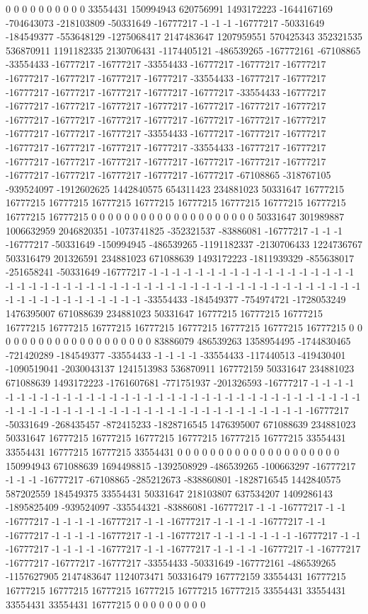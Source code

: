 0 0 0 0 0 0 0 0 0 0 33554431 150994943 620756991 1493172223 -1644167169 -704643073 -218103809 -50331649 -16777217 -1 -1 -1 -16777217 -50331649 -184549377 -553648129 -1275068417 2147483647 1207959551 570425343 352321535 536870911 1191182335 2130706431 -1174405121 -486539265 -167772161 -67108865 -33554433 -16777217 -16777217 -33554433 -16777217 -16777217 -16777217 -16777217 -16777217 -16777217 -16777217 -33554433 -16777217 -16777217 -16777217 -16777217 -16777217 -16777217 -16777217 -33554433 -16777217 -16777217 -16777217 -16777217 -16777217 -16777217 -16777217 -16777217 -16777217 -16777217 -16777217 -16777217 -16777217 -16777217 -16777217 -16777217 -16777217 -16777217 -33554433 -16777217 -16777217 -16777217 -16777217 -16777217 -16777217 -16777217 -33554433 -16777217 -16777217 -16777217 -16777217 -16777217 -16777217 -16777217 -16777217 -16777217 -16777217 -16777217 -16777217 -16777217 -16777217 -67108865 -318767105 -939524097 -1912602625 1442840575 654311423 234881023 50331647 16777215 16777215 16777215 16777215 16777215 16777215 16777215 16777215 16777215 16777215 16777215 0 0 0 0 0 0 0 0 0 0
0 0 0 0 0 0 0 0 0 0 50331647 301989887 1006632959 2046820351 -1073741825 -352321537 -83886081 -16777217 -1 -1 -1 -16777217 -50331649 -150994945 -486539265 -1191182337 -2130706433 1224736767 503316479 201326591 234881023 671088639 1493172223 -1811939329 -855638017 -251658241 -50331649 -16777217 -1 -1 -1 -1 -1 -1 -1 -1 -1 -1 -1 -1 -1 -1 -1 -1 -1 -1 -1 -1 -1 -1 -1 -1 -1 -1 -1 -1 -1 -1 -1 -1 -1 -1 -1 -1 -1 -1 -1 -1 -1 -1 -1 -1 -1 -1 -1 -1 -1 -1 -1 -1 -1 -1 -1 -1 -1 -1 -1 -1 -1 -33554433 -184549377 -754974721 -1728053249 1476395007 671088639 234881023 50331647 16777215 16777215 16777215 16777215 16777215 16777215 16777215 16777215 16777215 16777215 16777215 0 0 0 0 0 0 0 0 0 0
0 0 0 0 0 0 0 0 0 0 83886079 486539263 1358954495 -1744830465 -721420289 -184549377 -33554433 -1 -1 -1 -1 -33554433 -117440513 -419430401 -1090519041 -2030043137 1241513983 536870911 167772159 50331647 234881023 671088639 1493172223 -1761607681 -771751937 -201326593 -16777217 -1 -1 -1 -1 -1 -1 -1 -1 -1 -1 -1 -1 -1 -1 -1 -1 -1 -1 -1 -1 -1 -1 -1 -1 -1 -1 -1 -1 -1 -1 -1 -1 -1 -1 -1 -1 -1 -1 -1 -1 -1 -1 -1 -1 -1 -1 -1 -1 -1 -1 -1 -1 -1 -1 -1 -1 -1 -1 -1 -1 -1 -16777217 -50331649 -268435457 -872415233 -1828716545 1476395007 671088639 234881023 50331647 16777215 16777215 16777215 16777215 16777215 16777215 33554431 33554431 16777215 16777215 33554431 0 0 0 0 0 0 0 0 0 0
0 0 0 0 0 0 0 0 0 0 150994943 671088639 1694498815 -1392508929 -486539265 -100663297 -16777217 -1 -1 -1 -16777217 -67108865 -285212673 -838860801 -1828716545 1442840575 587202559 184549375 33554431 50331647 218103807 637534207 1409286143 -1895825409 -939524097 -335544321 -83886081 -16777217 -1 -1 -16777217 -1 -1 -16777217 -1 -1 -1 -1 -16777217 -1 -1 -16777217 -1 -1 -1 -1 -16777217 -1 -1 -16777217 -1 -1 -1 -1 -16777217 -1 -1 -16777217 -1 -1 -1 -1 -1 -1 -1 -16777217 -1 -1 -16777217 -1 -1 -1 -1 -16777217 -1 -1 -16777217 -1 -1 -1 -1 -16777217 -1 -16777217 -16777217 -16777217 -16777217 -33554433 -50331649 -167772161 -486539265 -1157627905 2147483647 1124073471 503316479 167772159 33554431 16777215 16777215 16777215 16777215 16777215 16777215 16777215 33554431 33554431 33554431 33554431 16777215 0 0 0 0 0 0 0 0 0
